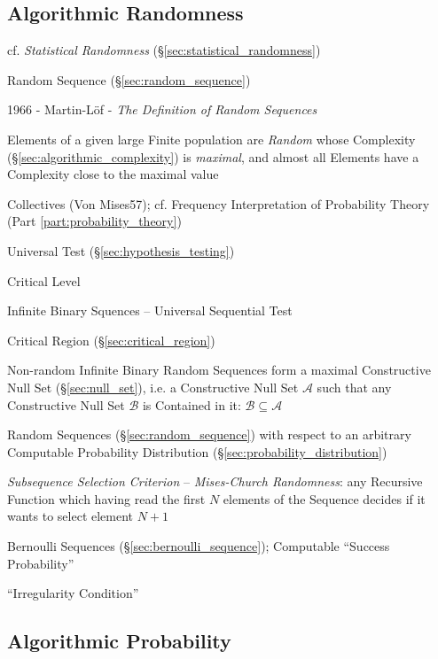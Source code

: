 \subsection{Algorithmic Randomness}\label{sec:algorithmic_randomness}

cf. \emph{Statistical Randomness} (\S\ref{sec:statistical_randomness})

Random Sequence (\S\ref{sec:random_sequence})

1966 - Martin-L\"of - \emph{The Definition of Random Sequences}

Elements of a given large Finite population are \emph{Random} whose Complexity
(\S\ref{sec:algorithmic_complexity}) is \emph{maximal}, and almost all Elements
have a Complexity close to the maximal value

Collectives (Von Mises57); cf. Frequency Interpretation of Probability Theory
(Part \ref{part:probability_theory})

Universal Test (\S\ref{sec:hypothesis_testing})

Critical Level

Infinite Binary Squences -- Universal Sequential Test

Critical Region (\S\ref{sec:critical_region})

Non-random Infinite Binary Random Sequences form a maximal Constructive Null Set
(\S\ref{sec:null_set}), i.e. a Constructive Null Set $\mathcal{A}$ such that any
Constructive Null Set $\mathcal{B}$ is Contained in it:
$\mathcal{B} \subseteq \mathcal{A}$

Random Sequences (\S\ref{sec:random_sequence}) with respect to an arbitrary
Computable Probability Distribution (\S\ref{sec:probability_distribution})

\emph{Subsequence Selection Criterion} --
\emph{Mises-Church Randomness}: any Recursive Function which having read the
first $N$ elements of the Sequence decides if it wants to select element $N+1$

Bernoulli Sequences (\S\ref{sec:bernoulli_sequence}); Computable ``Success
Probability''

``Irregularity Condition''



\subsection{Algorithmic Probability}\label{sec:algorithmic_probability}

